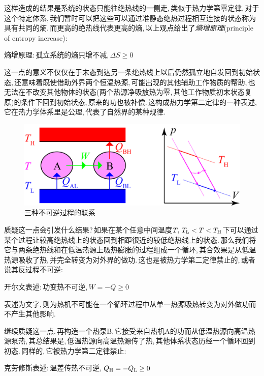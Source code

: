 这样造成的结果是系统的状态只能往绝热线的一侧走,\,类似于热力学第零定律,\,对于这个特定体系,\,我们暂时可以把这些可以通过准静态绝热过程相互连接的状态称为具有共同的熵.\,而更高的绝热线代表更高的熵,\,以上观点给出了\emph{熵增原理}(principle of entropy increase):

\begin{center}
\hei 熵增原理:\,孤立系统的熵只增不减,\,$\Delta S \geq 0$
\end{center}

这一点的意义不仅仅在于末态到达另一条绝热线上以后仍然孤立地自发回到初始状态,\,还意味着既使借助外界\ca 两个恒温热源,\,可能出现的其他辅助工作物质的帮助,\,也无法在不改变其他物体的状态(两个热源净吸放热为零,\,其他工作物质初末状态复原)的条件下回到初始状态,\,原来的功也被补偿.\,这构成热力学第二定律的一种表述,\,它在热力学体系里是公理,\,代表了自然界的某种规律.

\begin{figure}[H]
\centering
\includegraphics[width=15cm]{image/5-2-14.png}
\caption{三种不可逆过程的联系}\label{fig5-2-14}
\end{figure}

质疑这一点会引发什么结果?\,如果在某个任意中间温度$T,\,T_{\rm L}<T<T_{\rm H}$下可以通过某个过程让较高绝热线上的状态回到相距很近的较低绝热线上的状态.\,那么我们将它与两条绝热线和在低温热源上吸热膨胀的过程组成一个循环,\,其合效果是从低温热源吸收了热,\,并完全转变为对外界的做功.\,这也是被热力学第二定律禁止的,\,或者说其反过程不可逆:

\begin{center}
\hei 开尔文表述:\,功变热不可逆,\,$W=-Q\geq 0$
\end{center}

表述为文字,\,则为热机不可能在一个循环过程中从单一热源吸热转变为对外做功而不产生其他影响.

继续质疑这一点.\,再构造一个热泵B,\,它接受来自热机A的功而从低温热源向高温热源泵热,\,其总结果是,\,低温热源向高温热源传了热,\,其他体系状态历经一个循环回到初态.\,同样的,\,它被热力学第二定律禁止:

\begin{center}
\hei 克劳修斯表述:\,温差传热不可逆,\,$Q_{\rm H}=-Q_{\rm L}\geq 0$
\end{center}

